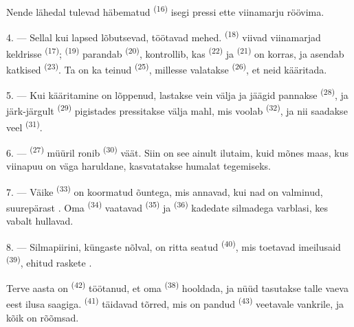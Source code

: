 Nende lähedal tulevad häbematud  \textsuperscript{(16)} isegi pressi
ette viinamarju röövima.

4. --- Sellal kui lapsed lõbutsevad, töötavad mehed. 
\textsuperscript{(18)} viivad viinamarjad keldrisse 
\textsuperscript{(17)};  \textsuperscript{(19)} parandab 
\textsuperscript{(20)}, kontrollib, kas  \textsuperscript{(22)} ja
 \textsuperscript{(21)} on korras, ja asendab katkised 
\textsuperscript{(23)}. Ta on ka teinud  \textsuperscript{(25)}, millesse
valatakse  \textsuperscript{(26)}, et neid kääritada.

5. --- Kui kääritamine on lõppenud, lastakse vein välja ja jäägid pannakse
 \textsuperscript{(28)}, ja järk-järgult 
\textsuperscript{(29)} pigistades pressitakse välja mahl, mis voolab 
\textsuperscript{(32)}, ja nii saadakse veel  \textsuperscript{(31)}.

\VUsaut{6.0mm}
\VUsaut{3.4mm}

6. ---  \textsuperscript{(27)} müüril ronib 
\textsuperscript{(30)} väät. Siin on see ainult ilutaim, kuid mõnes maas, kus viinapuu
on väga haruldane, kasvatatakse humalat  tegemiseks.

7. --- Väike  \textsuperscript{(33)} on koormatud õuntega, mis annavad,
kui nad on valminud, suurepärast . Oma 
\textsuperscript{(34)} vaatavad  \textsuperscript{(35)} ja
 \textsuperscript{(36)} kadedate silmadega varblasi, kes vabalt
hullavad.

8. --- Silmapiirini, küngaste nõlval, on ritta seatud 
\textsuperscript{(40)}, mis toetavad imeilusaid 
\textsuperscript{(39)}, ehitud raskete .

Terve aasta on  \textsuperscript{(42)} töötanud, et oma
 \textsuperscript{(38)} hooldada, ja nüüd tasutakse talle vaeva eest
ilusa saagiga.  \textsuperscript{(41)} täidavad tõrred, mis on pandud
 \textsuperscript{(43)} veetavale vankrile, ja kõik on rõõmsad.

